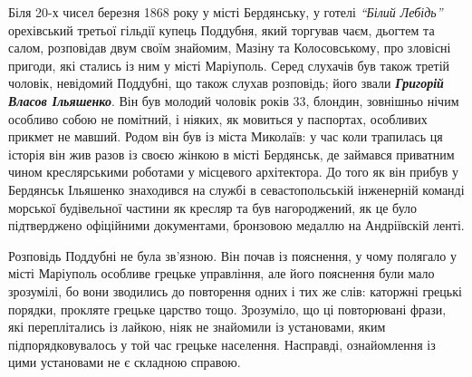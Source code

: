 \documentclass[a4paper,20pt]{report}
\begin{document}
\Large

Біля 20-х чисел березня 1868 року у місті Бердянську, у готелі \emph{``Білий Лебідь''}
орехівський третьої гільдії купець Поддубня, який торгував чаєм, дьогтем та
салом, розповідав двум своїм знайомим, Мазіну та Колосовському, про зловісні
пригоди, які стались із ним у місті Маріуполь. Серед слухачів був також третій
чоловік, невідомий Поддубні, що також слухав розповідь; його звали \textbf{\em
Григорій Власов Ільяшенко}. Він був молодий чоловік років 33, блондин,
зовнішньо нічим особливо собою не помітний, і ніяких, як мовиться у паспортах,
особливих прикмет не мавший.  Родом він був із міста Миколаїв: у час коли
трапилась ця історія він жив разов із своєю жінкою в місті Бердянськ, де
займався приватним чином креслярськими роботами у місцевого архітектора. До
того як він прибув у Бердянськ Ільяшенко знаходився на службі в
севастопольській інженерній команді морської будівельної частини як кресляр та
був нагороджений, як це було підтверджено офіційними документами, бронзовою
медаллю на Андріївскій ленті.

Розповідь Поддубні не була зв'язною. Він почав із пояснення, у чому полягало у
місті Маріуполь особливе грецьке управління, але його пояснення були мало
зрозумілі, бо вони зводились до повторення одних і тих же слів: каторжні
грецькі порядки, прокляте грецьке царство тощо. Зрозуміло, що ці повторювані
фрази, які переплітались із лайкою, ніяк не знайомили із установами, яким
підпорядковувалось у той час грецьке населення. Насправді, ознайомлення із цими
установами не є складною справою.
\end{document}
